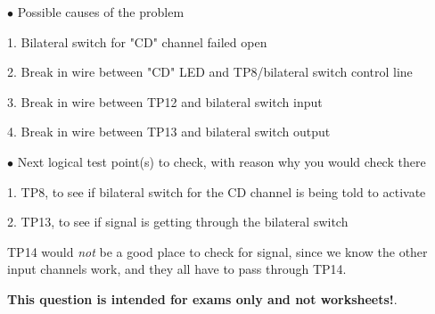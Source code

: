\medskip
\goodbreak
\item{$\bullet$} Possible causes of the problem
\item{1.} Bilateral switch for "CD" channel failed open
\item{2.} Break in wire between "CD" LED and TP8/bilateral switch control line
\item{3.} Break in wire between TP12 and bilateral switch input
\item{4.} Break in wire between TP13 and bilateral switch output
\medskip

\medskip
\goodbreak
\item{$\bullet$} Next logical test point(s) to check, with reason why you would check there
\item{1.} TP8, to see if bilateral switch for the CD channel is being told to activate
\item{2.} TP13, to see if signal is getting through the bilateral switch
\medskip

TP14 would {\it not} be a good place to check for signal, since we know the other input channels work, and they all have to pass through TP14.







{\bf This question is intended for exams only and not worksheets!}.




